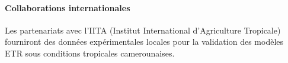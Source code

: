 \documentclass[12pt, a4paper]{article}
\begin{document}
\paragraph{Collaborations internationales} Les partenariats avec l'IITA (Institut International d'Agriculture Tropicale) fourniront des données expérimentales locales pour la validation des modèles ETR sous conditions tropicales camerounaises.

\newpage



\end{document}

